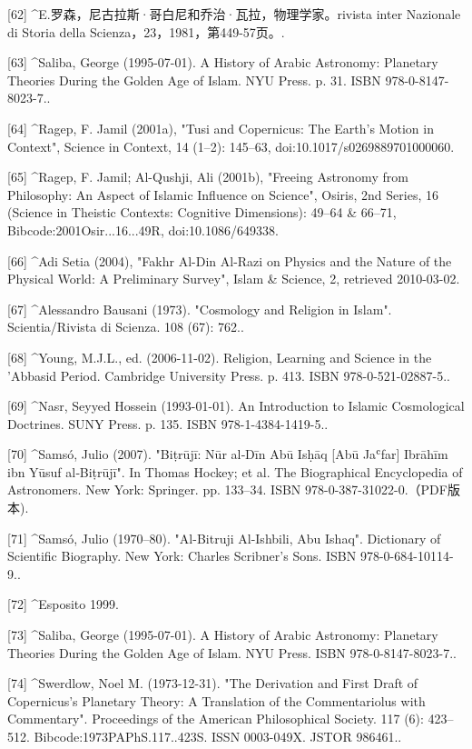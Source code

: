 [62]
^E.罗森，尼古拉斯·哥白尼和乔治·瓦拉，物理学家。rivista inter Nazionale di Storia della Scienza，23，1981，第449-57页。.

[63]
^Saliba, George (1995-07-01). A History of Arabic Astronomy: Planetary Theories During the Golden Age of Islam. NYU Press. p. 31. ISBN 978-0-8147-8023-7..

[64]
^Ragep, F. Jamil (2001a), "Tusi and Copernicus: The Earth's Motion in Context", Science in Context, 14 (1–2): 145–63, doi:10.1017/s0269889701000060.

[65]
^Ragep, F. Jamil; Al-Qushji, Ali (2001b), "Freeing Astronomy from Philosophy: An Aspect of Islamic Influence on Science", Osiris, 2nd Series, 16 (Science in Theistic Contexts: Cognitive Dimensions): 49–64 & 66–71, Bibcode:2001Osir...16...49R, doi:10.1086/649338.

[66]
^Adi Setia (2004), "Fakhr Al-Din Al-Razi on Physics and the Nature of the Physical World: A Preliminary Survey", Islam & Science, 2, retrieved 2010-03-02.

[67]
^Alessandro Bausani (1973). "Cosmology and Religion in Islam". Scientia/Rivista di Scienza. 108 (67): 762..

[68]
^Young, M.J.L., ed. (2006-11-02). Religion, Learning and Science in the 'Abbasid Period. Cambridge University Press. p. 413. ISBN 978-0-521-02887-5..

[69]
^Nasr, Seyyed Hossein (1993-01-01). An Introduction to Islamic Cosmological Doctrines. SUNY Press. p. 135. ISBN 978-1-4384-1419-5..

[70]
^Samsó, Julio (2007). "Biṭrūjī: Nūr al‐Dīn Abū Isḥāq [Abū Jaʿfar] Ibrāhīm ibn Yūsuf al‐Biṭrūjī". In Thomas Hockey; et al. The Biographical Encyclopedia of Astronomers. New York: Springer. pp. 133–34. ISBN 978-0-387-31022-0.（PDF版本).

[71]
^Samsó, Julio (1970–80). "Al-Bitruji Al-Ishbili, Abu Ishaq". Dictionary of Scientific Biography. New York: Charles Scribner's Sons. ISBN 978-0-684-10114-9..

[72]
^Esposito 1999.

[73]
^Saliba, George (1995-07-01). A History of Arabic Astronomy: Planetary Theories During the Golden Age of Islam. NYU Press. ISBN 978-0-8147-8023-7..

[74]
^Swerdlow, Noel M. (1973-12-31). "The Derivation and First Draft of Copernicus's Planetary Theory: A Translation of the Commentariolus with Commentary". Proceedings of the American Philosophical Society. 117 (6): 423–512. Bibcode:1973PAPhS.117..423S. ISSN 0003-049X. JSTOR 986461..

